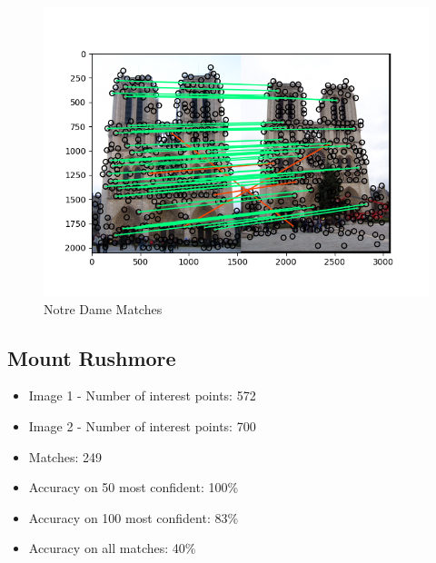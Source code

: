 \documentclass{article}
\begin{document}
\begin{figure}[H] %
    \centering
    \includegraphics[width=\textwidth]{images/notre_dame_matches.png} %
    \caption{Notre Dame Matches}
    \label{fig:n_dame_match}
\end{figure}

\subsection{Mount Rushmore}
\begin{itemize}
    \item Image 1 - Number of interest points: 572
    \item Image 2 - Number of interest points: 700
    \item Matches: 249
    \item Accuracy on 50 most confident: 100\%
    \item Accuracy on 100 most confident: 83\%
    \item Accuracy on all matches: 40\%
\end{itemize}
\end{document}
